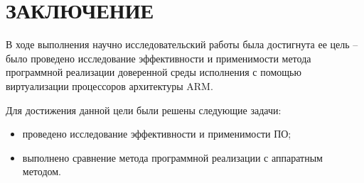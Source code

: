 \section*{ЗАКЛЮЧЕНИЕ}

В ходе выполнения научно исследовательский работы была достигнута ее цель -- было проведено исследование эффективности и применимости метода программной реализации доверенной среды исполнения с помощью виртуализации процессоров архитектуры ARM.

Для достижения данной цели были решены следующие задачи:

\begin{itemize}
	\item проведено исследование эффективности и применимости ПО;
	\item выполнено сравнение метода программной реализации с аппаратным методом.
\end{itemize}

\pagebreak
